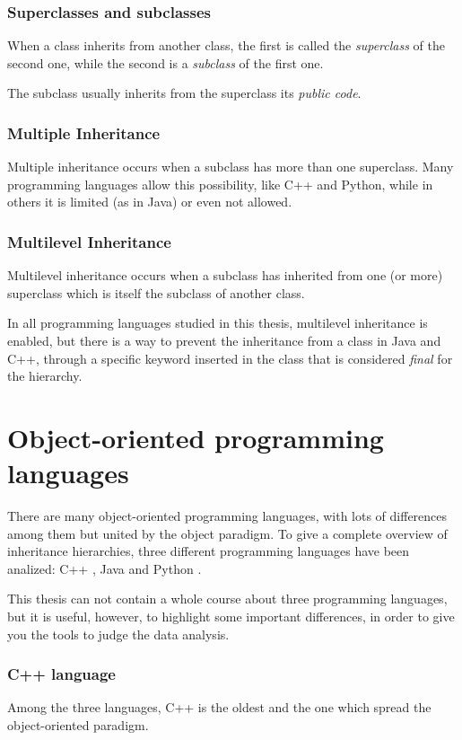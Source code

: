 \subsubsection{Superclasses and subclasses}
When a class inherits from another class, the first is called the \textit{superclass} of the second one, while the second is a \textit{subclass} of the first one.

The subclass usually inherits from the superclass its \textit{public code}.

\subsubsection{Multiple Inheritance}
Multiple inheritance occurs when a subclass has more than one superclass. Many programming languages allow this possibility, like C++ and Python, while in others it is limited (as in Java) or even not allowed.

\subsubsection{Multilevel Inheritance}
Multilevel inheritance occurs when a subclass has inherited from one (or more) superclass which is itself the subclass of another class.

In all programming languages studied in this thesis, multilevel inheritance is enabled, but there is a way to prevent the inheritance from a class in Java and C++, through a specific keyword inserted in the class that is considered \textit{final} for the hierarchy.
\newpage
\section{Object-oriented programming languages}
There are many object-oriented programming languages, with lots of differences among them but united by the object paradigm. To give a complete overview of inheritance hierarchies, three different programming languages have been analized: C++ \cite{cpp}, Java \cite{java} and Python \cite{python}.

This thesis can not contain a whole course about three programming languages, but it is useful, however, to highlight some important differences, in order to give you the tools to judge the data analysis.

\subsubsection{C++ language}
Among the three languages, C++ is the oldest and the one which spread the object-oriented paradigm.

